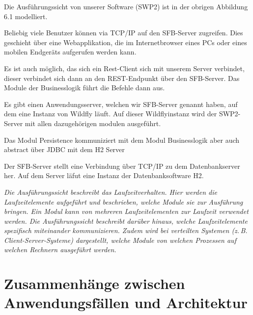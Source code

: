 \documentclass[enabledeprecatedfontcommands,fontsize=12pt,paper=a4,twoside]{scrartcl}
\begin{document}
{ Die Ausführungssicht von unserer Software (SWP2) ist in der obrigen Abbildung
  6.1 modelliert.

Beliebig viele Benutzer können via TCP/IP auf den SFB-Server zugreifen. Dies
geschieht über eine Webapplikation, die im Internetbrowser eines PCs oder eines
mobilen Endgeräts aufgerufen werden kann.

Es ist auch möglich, das sich ein Rest-Client sich mit unserem Server verbindet,
dieser verbindet sich dann an den REST-Endpunkt über den SFB-Server. Das Module
der Businesslogik führt die Befehle dann aus.

Es gibt einen Anwendungsserver, welchen wir SFB-Server genannt haben, auf dem
eine Instanz von Wildfly läuft. Auf dieser Wildflyinstanz wird der SWP2-Server
mit allen dazugehörigen modulen ausgeführt.

Das Modul Persistence kommuniziert mit dem Modul Businesslogik aber auch
\glqq abstract \grqq über JDBC mit dem H2 Server

Der SFB-Server stellt eine Verbindung über TCP/IP zu dem
Datenbankserver her. Auf dem Server läfut eine Instanz der Datenbanksoftware H2.
}

{\it
Die Ausführungssicht beschreibt das Laufzeitverhalten. Hier
werden die Laufzeitelemente aufgeführt und beschrieben, welche Module
sie zur Ausführung bringen. Ein Modul kann von mehreren
Laufzeitelementen zur Laufzeit verwendet werden. Die Ausführungssicht
beschreibt darüber hinaus, welche Laufzeitelemente spezifisch
miteinander kommunizieren. Zudem wird bei verteilten Systemen
(z.\,B. Client-Server-Systeme) dargestellt, welche Module von welchen
Prozessen auf welchen Rechnern ausgeführt werden.}


\section[Zusammenhänge zwischen Anwendungsfällen und Architektur]{Zusammenhänge zwischen Anwendungsfällen und Architektur}
\label{sec:anwendungsfaelle}
\end{document}
